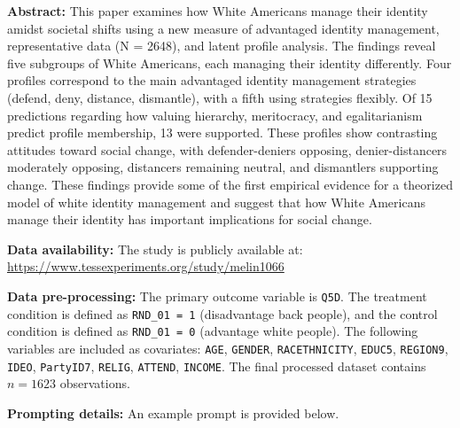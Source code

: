 \textbf{Abstract:} This paper examines how White Americans manage their identity amidst societal shifts using a new measure of advantaged identity management, representative data (N = 2648), and latent profile analysis. The findings reveal five subgroups of White Americans, each managing their identity differently. Four profiles correspond to the main advantaged identity management strategies (defend, deny, distance, dismantle), with a fifth using strategies flexibly. Of 15 predictions regarding how valuing hierarchy, meritocracy, and egalitarianism predict profile membership, 13 were supported. These profiles show contrasting attitudes toward social change, with defender-deniers opposing, denier-distancers moderately opposing, distancers remaining neutral, and dismantlers supporting change. These findings provide some of the first empirical evidence for a theorized model of white identity management and suggest that how White Americans manage their identity has important implications for social change.

\textbf{Data availability:}  The study is publicly available at: \url{https://www.tessexperiments.org/study/melin1066}

\textbf{Data pre-processing:} The primary outcome variable is \texttt{Q5D}. The treatment condition is defined as \texttt{RND\_01 = 1} (disadvantage back people), and the control condition is defined as \texttt{RND\_01 = 0} (advantage white people). The following variables are included as covariates: \texttt{AGE}, \texttt{GENDER}, \texttt{RACETHNICITY}, \texttt{EDUC5}, \texttt{REGION9}, \texttt{IDEO}, \texttt{PartyID7}, \texttt{RELIG}, \texttt{ATTEND}, \texttt{INCOME}. The final processed dataset contains $n=1623$ observations.

\textbf{Prompting details:} 
An example prompt is provided below.

